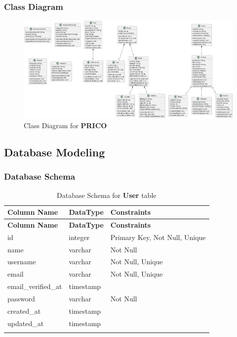 \documentclass[12pt]{report}
\begin{document}
\subsubsection{Class Diagram}

\begin{figure}[H]
	\begin{center}
		\includegraphics[width=1\textwidth]{diagrams/class}
	\end{center}
	\caption{Class Diagram for \textbf{PRICO}}
\end{figure}

\subsection{Database Modeling}

\subsubsection{Database Schema}

\begin{longtable}[H]{|l|l|p{6.5cm}||}
	\hline
	\textbf{Column Name} & \textbf{DataType} & \textbf{Constraints}          \\
	\hline
	\endfirsthead
	\hline
	\textbf{Column Name} & \textbf{DataType} & \textbf{Constraints}          \\
	\hline
	\endhead
	id                   & integer           & Primary Key, Not Null, Unique \\
	\hline
	name                 & varchar           & Not Null                      \\
	\hline
	username             & varchar           & Not Null, Unique              \\
	\hline
	email                & varchar           & Not Null, Unique              \\
	\hline
	email\_verified\_at  & timestamp         &                               \\
	\hline
	password             & varchar           & Not Null                      \\
	\hline
	created\_at          & timestamp         &                               \\
	\hline
	updated\_at          & timestamp         &                               \\
	\hline
	\hline
	\caption{Database Schema for \textbf{User} table}\label{tab:tableUser}
\end{longtable}
\end{document}
